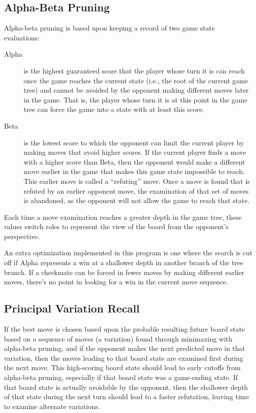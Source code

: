 \documentclass[letterpaper]{article}
\renewcommand{\_}{\allowbreak\textunderscore\allowbreak}
\begin{document}
\subsection{Alpha-Beta Pruning}

Alpha-beta pruning is based upon keeping a record of two game state evaluations:
\begin{description}
	\item[Alpha] is the highest guaranteed score that the player whose turn it is can reach once the game reaches the current state (i.e., the root of the current game tree) and cannot be avoided by the opponent making different moves later in the game. That is, the player whose turn it is at this point in the game tree can force the game into a state with at least this score.
	\item[Beta] is the lowest score to which the opponent can limit the current player by making moves that avoid higher scores. If the current player finds a move with a higher score than Beta, then the opponent would make a different move earlier in the game that makes this game state impossible to reach. This earlier move is called a ``refuting'' move. Once a move is found that is refuted by an earlier opponent move, the examination of that set of moves is abandoned, as the opponent will not allow the game to reach that state.
\end{description}
Each time a move examination reaches a greater depth in the game tree, these values switch roles to represent the view of the board from the opponent's perspective.

An extra optimization implemented in this program is one where the search is cut off if Alpha represents a win at a shallower depth in another branch of the tree branch. If a checkmate can be forced in fewer moves by making different earlier moves, there's no point in looking for a win in the current move sequence.

\subsection{Principal Variation Recall}

If the best move is chosen based upon the probable resulting future board state based on a sequence of moves (a variation) found through minimaxing with alpha-beta pruning, and if the opponent makes the next predicted move in that variation, then the moves leading to that board state are examined first during the next move. This high-scoring board state should lead to early cutoffs from alpha-beta pruning, especially if that board state was a game-ending state. If that board state is actually avoidable by the opponent, then the shallower depth of that state during the next turn should lead to a faster refutation, leaving time to examine alternate variations.
\end{document}
